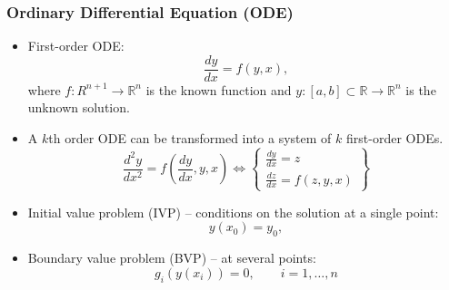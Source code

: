 \documentclass[bigger,handout]{beamer}
\newenvironment{stepitemize}{\begin{itemize}[<+->]}{\end{itemize} }
\begin{document}
\begin{frame}%
  
\frametitle{Ordinary Differential Equation (ODE)}

\begin{stepitemize}
\item First-order ODE: 
\begin{equation*}
\frac{dy}{dx}=f(y,x),
\end{equation*}%
where $f:R^{n+1}\rightarrow \mathbb{R}^{n}$ is the known function\newline
and $y:[a,b]\subset \mathbb{R}\rightarrow \mathbb{R}^{n}$ is the unknown
solution.

\item A $k$th order ODE can be transformed into a system of $k$ first-order
ODEs. 
\begin{equation*}
\frac{d^{2}y}{dx^{2}}=f(\frac{dy}{dx},y,x)\Leftrightarrow \left\{ 
\begin{array}{c}
\frac{dy}{dx}=z \\ 
\frac{dz}{dx}=f(z,y,x)%
\end{array}%
\right\}
\end{equation*}

\item Initial value problem (IVP) -- conditions on the solution \newline
at a single point: 
\begin{equation*}
y(x_{0})=y_{0},
\end{equation*}

\item Boundary value problem (BVP) -- at several points: 
\begin{equation*}
g_{i}(y(x_{i}))=0,\qquad i=1,\ldots ,n
\end{equation*}
\end{stepitemize}

  
 
\end{frame}%
  
 
 
\end{document}

